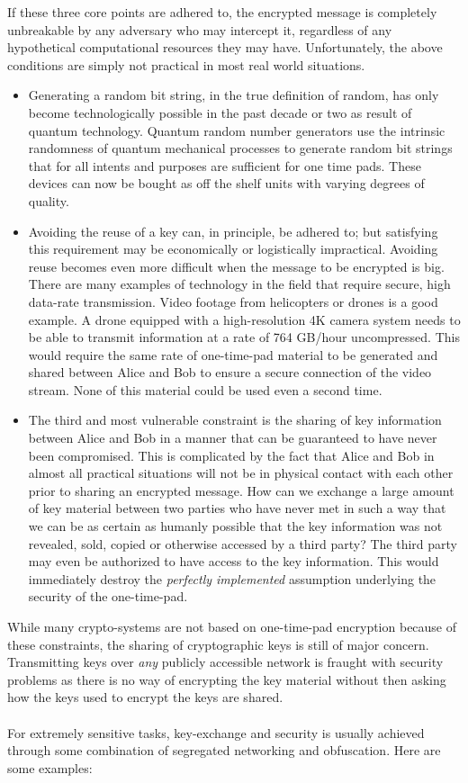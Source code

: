 \documentclass[aps,prl,twocolumn,10pt,nofootinbib]{revtex4}
\begin{document}
If these three core points are adhered to, the encrypted message is completely unbreakable by any adversary who may intercept it, regardless of any hypothetical computational resources they may have. Unfortunately, the above conditions are simply not practical in most real world situations.  
\begin{itemize}
\item Generating a random bit string, in the true definition of random, has only become technologically possible in the past decade or two as result of quantum technology.  Quantum random number generators use the intrinsic randomness of quantum mechanical processes to generate random bit strings that for all intents and purposes are sufficient for one time pads.  These devices can now be bought as off the shelf units with varying degrees of quality.  
\item Avoiding the reuse of a key can, in principle, be adhered to; but satisfying this requirement may be economically or logistically impractical.  Avoiding reuse becomes even more difficult when the message to be encrypted is big.  There are many examples of technology in the field that require secure, high data-rate transmission.  Video footage from helicopters or drones is a good example.  A drone equipped with a high-resolution 4K camera system needs to be able to transmit information at a rate of 764 GB/hour uncompressed.  This would require the same rate of one-time-pad material to be generated and shared between Alice and Bob to ensure a secure connection of the video stream.  None of this material could be used even a second time.  
\item The third and most vulnerable constraint is the sharing of key information between Alice and Bob in a manner that can be guaranteed to have never been compromised.  This is complicated by the fact that Alice and Bob in almost all practical situations will not be in physical contact with each other prior to sharing an encrypted message.  How can we exchange a large amount of key material between two parties who have never met in such a way that we can be as certain as humanly possible that the key information was not revealed, sold, copied or otherwise accessed by a third party?  The third party may even be authorized to have access to the key information.  This would immediately destroy the {\em perfectly implemented} assumption underlying the security of the one-time-pad.  
\end{itemize}

While many crypto-systems are not based on one-time-pad encryption because of these constraints, the sharing of cryptographic keys is still of major concern.  Transmitting  keys over {\em any} publicly accessible network is fraught with security problems as there is no way of encrypting the key material without then asking how the keys used to encrypt the keys are shared.
\\
\\
For extremely sensitive tasks, key-exchange and security is usually achieved through some combination of segregated networking and obfuscation. Here are some examples: 
\end{document}

